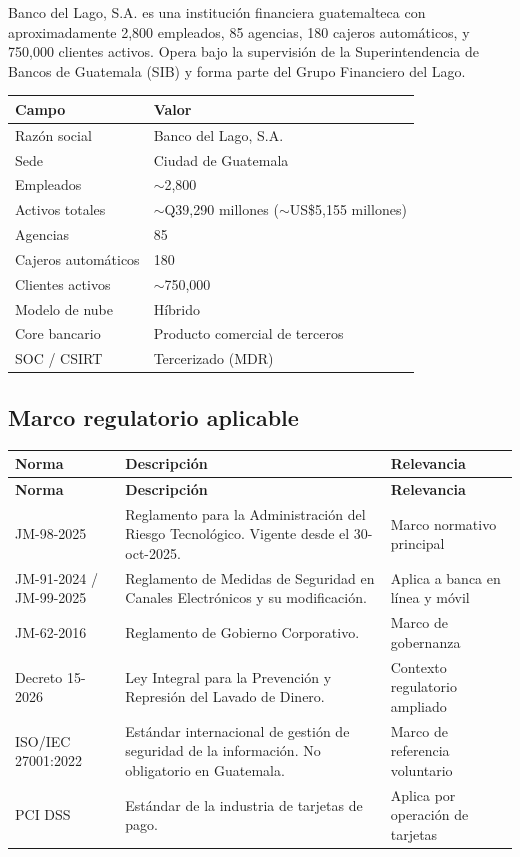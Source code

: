 \documentclass[11pt,a4paper]{article}
\begin{document}
	Banco del Lago, S.A. es una institución financiera guatemalteca con aproximadamente 2,800 empleados, 85 agencias, 180 cajeros automáticos, y 750,000 clientes activos. Opera bajo la supervisión de la Superintendencia de Bancos de Guatemala (SIB) y forma parte del Grupo Financiero del Lago.
	
	\begin{table}[H]
		\centering
		\begin{tabular}{@{}ll@{}}
			\toprule
			\textbf{Campo} & \textbf{Valor} \\ \midrule
			Razón social & Banco del Lago, S.A. \\
			Sede & Ciudad de Guatemala \\
			Empleados & $\sim$2,800 \\
			Activos totales & $\sim$Q39,290 millones ($\sim$US\$5,155 millones) \\
			Agencias & 85 \\
			Cajeros automáticos & 180 \\
			Clientes activos & $\sim$750,000 \\
			Modelo de nube & Híbrido \\
			Core bancario & Producto comercial de terceros \\
			SOC / CSIRT & Tercerizado (MDR) \\
			\bottomrule
		\end{tabular}
	\end{table}
	
	\subsection{Marco regulatorio aplicable}
	
	\begin{longtable}{@{}p{3cm}p{8cm}p{4cm}@{}}
		\toprule
		\textbf{Norma} & \textbf{Descripción} & \textbf{Relevancia} \\ \midrule
		\endfirsthead
		\toprule
		\textbf{Norma} & \textbf{Descripción} & \textbf{Relevancia} \\ \midrule
		\endhead
		JM-98-2025 & Reglamento para la Administración del Riesgo Tecnológico. Vigente desde el 30-oct-2025. & Marco normativo principal \\ \midrule
		JM-91-2024 / JM-99-2025 & Reglamento de Medidas de Seguridad en Canales Electrónicos y su modificación. & Aplica a banca en línea y móvil \\ \midrule
		JM-62-2016 & Reglamento de Gobierno Corporativo. & Marco de gobernanza \\ \midrule
		Decreto 15-2026 & Ley Integral para la Prevención y Represión del Lavado de Dinero. & Contexto regulatorio ampliado \\ \midrule
		ISO/IEC 27001:2022 & Estándar internacional de gestión de seguridad de la información. No obligatorio en Guatemala. & Marco de referencia voluntario \\ \midrule
		PCI DSS & Estándar de la industria de tarjetas de pago. & Aplica por operación de tarjetas \\ \bottomrule
	\end{longtable}
	
\end{document}
